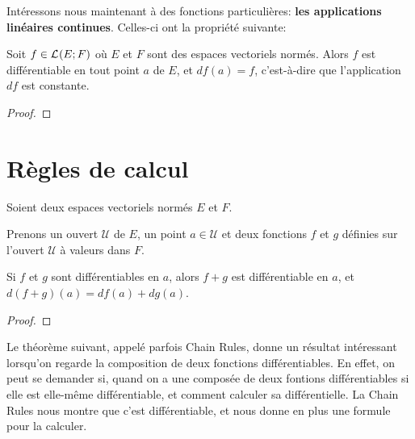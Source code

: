 Intéressons nous maintenant à des fonctions particulières: \textbf{les applications
linéaires continues}.
Celles-ci ont la propriété suivante:

\begin{proposition}
	Soit $f \in \mathcal{L}_{}(E; F)$ où $E$ et $F$ sont des espaces vectoriels
	normés. Alors $f$ est différentiable en tout point $a$ de $E$, et $df(a) =
	f$, c'est-à-dire que l'application $df$ est constante.
\end{proposition}

\ifdefined\outputproof
\begin{proof}

\end{proof}
\fi

\section{Règles de calcul}


%

Soient deux espaces vectoriels normés $E$ et $F$.

Prenons un ouvert $\mathcal{U}$ de $E$, un point $a \in \mathcal{U}$ et deux
fonctions $f$ et $g$ définies sur l'ouvert $\mathcal{U}$ à valeurs dans $F$.

\begin{proposition}
	Si $f$ et $g$ sont différentiables en $a$, alors $f + g$ est différentiable
	en $a$, et $d(f + g)(a) = df(a) + dg(a)$.
\end{proposition}

\ifdefined\outputproof
\begin{proof}

\end{proof}
\fi

Le théorème suivant, appelé parfois Chain Rules, donne un résultat intéressant
lorsqu'on regarde la composition de deux fonctions différentiables. En effet, on
peut se demander si, quand on a une composée de deux fontions différentiables
si elle est elle-même différentiable, et comment calculer sa différentielle. La
Chain Rules nous montre que c'est différentiable, et nous donne en plus une
formule pour la calculer.

